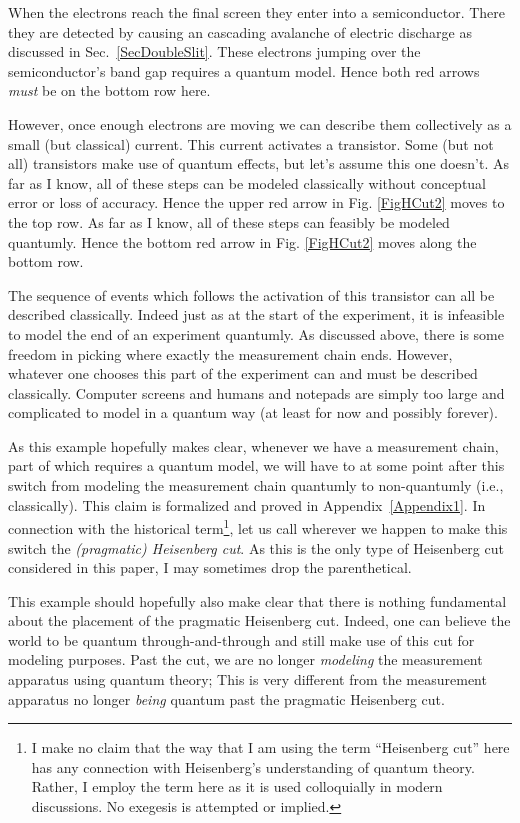 \documentclass[prd,twocolumn,superscriptaddress,floatfix,amsmath,amssymb,amsfonts,nofootinbib]{revtex4-2}
\begin{document}
When the electrons reach the final screen they enter into a  semiconductor. There they are detected by causing an cascading avalanche of electric discharge as discussed in Sec.~\ref{SecDoubleSlit}. These electrons jumping over the semiconductor's band gap requires a quantum model. Hence both red arrows \textit{must} be on the bottom row here. 

However, once enough electrons are moving we can describe them collectively as a small (but classical) current. This current activates a transistor. Some (but not all) transistors make use of quantum effects, but let's assume this one doesn't. As far as I know, all of these steps can be modeled classically without conceptual error or loss of accuracy. Hence the upper red arrow in Fig. \ref{FigHCut2} moves to the top row. As far as I know, all of these steps can feasibly be modeled quantumly. Hence the bottom red arrow in Fig. \ref{FigHCut2} moves along the bottom row.

The sequence of events which follows the activation of this transistor can all be described classically. Indeed just as at the start of the experiment, it is infeasible to model the end of an experiment quantumly. As discussed above, there is some freedom in picking where exactly the measurement chain ends. However, whatever one chooses this part of the experiment can and must be described classically. Computer screens and humans and notepads are simply too large and complicated to model in a quantum way (at least for now and possibly forever).

As this example hopefully makes clear, whenever we have a measurement chain, part of which requires a quantum model, we will have to at some point after this switch from modeling the measurement chain quantumly to non-quantumly (i.e., classically). This claim is formalized and proved in Appendix~\ref{Appendix1}. In connection with the historical term\footnote{I make no claim that the way that I am using the term ``Heisenberg cut'' here has any connection with Heisenberg's understanding of quantum theory. Rather, I employ the term here as it is used colloquially in modern discussions. No exegesis is attempted or implied.}, let us call wherever we happen to make this switch the \textit{(pragmatic) Heisenberg cut}. As this is the only type of Heisenberg cut considered in this paper, I may sometimes drop the parenthetical.

This example should hopefully also make clear that there is nothing fundamental about the placement of the pragmatic Heisenberg cut. Indeed, one can believe the world to be quantum through-and-through and still make use of this cut for modeling purposes. Past the cut, we are no longer \textit{modeling} the measurement apparatus using quantum theory; This is very different from the measurement apparatus no longer \textit{being} quantum past the pragmatic Heisenberg cut.
\end{document}
